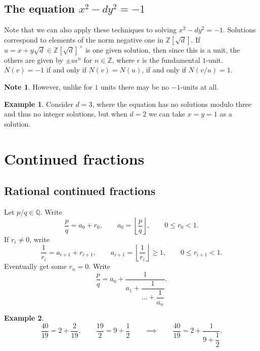 \documentclass{article}
\newcommand{\Z}{\mathbb{Z}}
\newcommand{\Q}{\mathbb{Q}}
\newcommand{\rb}[1]{\left( #1 \right)}
\renewcommand{\sb}[1]{\left[ #1 \right]}
\theoremstyle{definition}\newtheorem{definition}{Definition}
\theoremstyle{definition}\newtheorem{remark}[definition]{Remark}
\theoremstyle{definition}\newtheorem*{example}{Example}
\theoremstyle{definition}\newtheorem*{note}{Note}
\begin{document}

\subsection{The equation $ x^2 - dy^2 = - 1 $}

Note that we can also apply these techniques to solving $ x^2 - dy^2 = -1 $. Solutions correspond to elements of the norm negative one in $ \Z\sb{\sqrt{d}} $. If $ u = x + y\sqrt{d} \in \Z\sb{\sqrt{d}}^\times $ is one given solution, then since this is a unit, the others are given by $ \pm u\epsilon^n $ for $ n \in \Z $, where $ \epsilon $ is the fundamental $ 1 $-unit. $ N\rb{v} = -1 $ if and only if $ N\rb{v} = N\rb{u} $, if and only if $ N\rb{v / u} = 1 $.

\begin{note}
However, unlike for $ 1 $ units there may be no $ -1 $-units at all.
\end{note}

\begin{example}
Consider $ d = 3 $, where the equation has no solutions modulo three and thus no integer solutions, but when $ d = 2 $ we can take $ x = y = 1 $ as a solution.
\end{example}

\section{Continued fractions}

\subsection{Rational continued fractions}

Let $ p / q \in \Q $. Write
$$ \dfrac{p}{q} = a_0 + r_0, \qquad a_0 = \left\lfloor \dfrac{p}{q} \right\rfloor, \qquad 0 \le r_0 < 1. $$
If $ r_i \ne 0 $, write
$$ \dfrac{1}{r_i} = a_{i + 1} + r_{i + 1}, \qquad a_{i + 1} = \left\lfloor \dfrac{1}{r_i} \right\rfloor \ge 1, \qquad 0 \le r_{i + 1} < 1. $$
Eventually get some $ r_n = 0 $. Write
$$ \dfrac{p}{q} = a_0 + \dfrac{1}{a_1 + \dfrac{1}{\dots + \dfrac{1}{a_n}}}. $$

\begin{example}
$$ \dfrac{40}{19} = 2 + \dfrac{2}{19}, \qquad \dfrac{19}{2} = 9 + \dfrac{1}{2} \qquad \implies \qquad \dfrac{40}{19} = 2 + \dfrac{1}{9 + \dfrac{1}{2}}. $$
\end{example}
\end{document}
